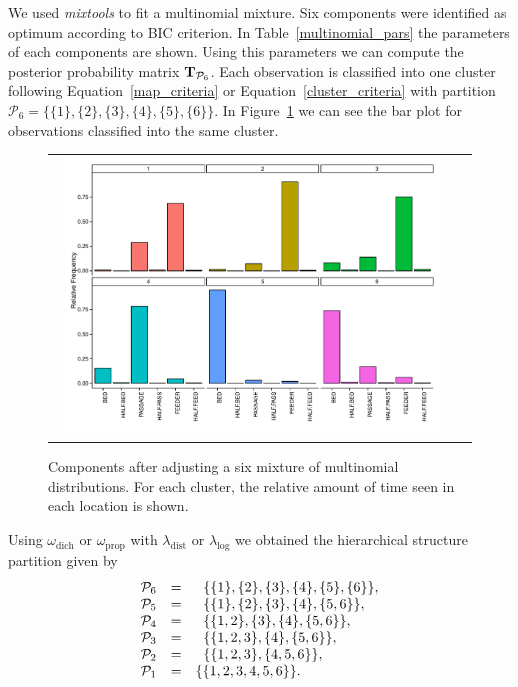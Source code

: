 \documentclass[submit]{smj}
\theoremstyle{definition}
\begin{document}
We used \emph{mixtools} \citep{benaglia2009mixtools} to fit a multinomial mixture. Six components were identified as optimum according to BIC criterion. In Table~\ref{multinomial_pars} the parameters of each components are shown. Using this parameters we can compute the posterior probability matrix $\text{\textbf{T}}_{\mathcal{P}_6}$. Each observation is classified into one cluster following Equation~\ref{map_criteria} or Equation~\ref{cluster_criteria} with partition $\mathcal{P}_6 = \{\{1\}, \{2\}, \{3\}, \{4\}, \{5\}, \{6\}\}$. In Figure~\ref{multinomial_mixture} we can see the bar plot for observations classified into the same cluster.

\begin{figure}[!t]
\begin{center}
\begin{tabular}{cc}
  \includegraphics[width=0.95\textwidth]{figures/multinomial_mixt_all.pdf} \\
 \end{tabular}
 \caption{Components after adjusting a six mixture of multinomial distributions. For each cluster, the relative amount of time seen in each location is shown.}\label{multinomial_mixture}
\end{center}
\end{figure}

Using $\omega_{\text{dich}}$ or  $\omega_{\text{prop}}$ with $\lambda_{\text{dist}}$ or $\lambda_{\log}$ we obtained the hierarchical structure partition given by
\begin{equation}
\begin{array}{r c l}
 \mathcal{P}_6&=& \;\; \{\{1\},\{2\},\{3\},\{4\},\{5\},\{6\}\}, \\
 \mathcal{P}_5&=& \;\; \{\{1\},\{2\},\{3\},\{4\},\{5,6\}\}, \\ 
 \mathcal{P}_4&=& \;\; \{\{1,2\},\{3\},\{4\},\{5,6\}\}, \\ 
 \mathcal{P}_3&=& \;\; \{\{1,2,3\},\{4\},\{5,6\}\}, \\ 
 \mathcal{P}_2&=& \;\; \{\{1,2,3\},\{4,5,6\}\}, \\ 
 \mathcal{P}_1&=& \{\{1,2,3,4,5,6\}\}.
\end{array}
\label{hier_ex_multinomial}
\end{equation}
\end{document}
